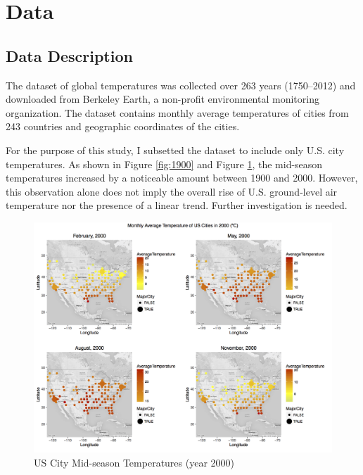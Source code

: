 \documentclass[12pt]{article}
\begin{document}
\section{Data}
\subsection{Data Description}
The dataset of global temperatures was collected over 263 years (1750--2012) and downloaded from Berkeley Earth, a non-profit environmental monitoring organization. The dataset contains monthly average temperatures of cities from 243 countries and geographic coordinates of the cities. 

\vspace{0.5cm}
\noindent For the purpose of this study, I subsetted the dataset to include only U.S. city temperatures. As shown in Figure \ref{fig:1900} and Figure \ref{fig:2000}, the mid-season temperatures increased by a noticeable amount between 1900 and 2000. However, this observation alone does not imply the overall rise of U.S. ground-level air temperature nor the presence of a linear trend. Further investigation is needed. 

\begin{figure}[H]
    \centering
    \includegraphics[width=\textwidth]{Figures/2000.png}
    \caption{US City Mid-season Temperatures (year 2000)}
    \label{fig:2000}
\end{figure}
\end{document}
